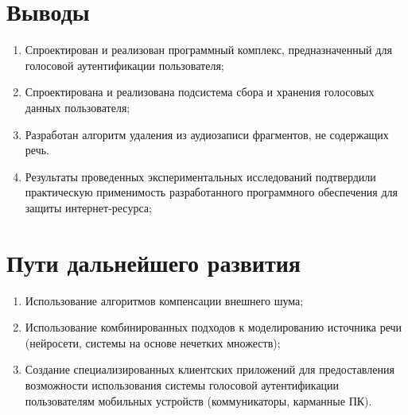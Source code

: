 \documentclass[12pt]{article}
\begin{document}
\begin{figure}[ht!]
\end{figure}

\section{Выводы}
\begin{enumerate}
\item Спроектирован и реализован программный комплекс, предназначенный для
голосовой аутентификации
пользователя;
\item Спроектирована и реализована подсистема сбора и хранения голосовых данных
пользователя;
\item Разработан алгоритм удаления из аудиозаписи фрагментов, не содержащих
речь.
\item Результаты проведенных экспериментальных исследований 
подтвердили практическую применимость разработанного программного обеспечения для защиты интернет-ресурса;
\end{enumerate}

\section{Пути дальнейшего развития}
\begin{enumerate}
\item Использование алгоритмов компенсации внешнего шума;
\item Использование комбинированных подходов к моделированию источника речи
(нейросети, системы на основе нечетких множеств);
\item Создание специализированных клиентских приложений для предоставления
возможности использования системы
голосовой аутентификации пользователям мобильных устройств (коммуникаторы,
карманные ПК).
\end{enumerate}
\end{document}
